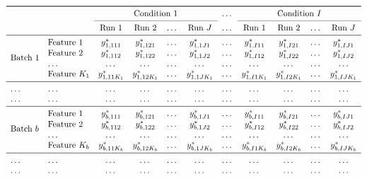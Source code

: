 \documentclass{mcp}
\begin{document}
\begin{figure}[h!]
\centering
\begin{footnotesize}
\[
\begin{array}{l l c c c c c c c c c} 
\toprule
 &  & \multicolumn{4}{c}{\text{Condition }1} & \dots & \multicolumn{4}{c}{\text{Condition }I} \\ 
\cmidrule{3-6} 
\cmidrule{8-11} 
 &  &  \text{Run }1 & \text{Run }2 & \dots & \text{Run }J & \dots & \text{Run }1 & \text{Run }2 & \dots & \text{Run }J \\
\midrule
\multirow{4}{*}{Batch $1$} & \text{Feature }1 & y_{1,111}^{\ast} & y_{1,121}^{\ast} & \dots & y_{1,1J1}^{\ast} & \dots & y_{1,I11}^{\ast} & y_{1,I21}^{\ast} & \dots & y_{1,IJ1}^{\ast} \\
 & \text{Feature }2 & y_{1,112}^{\ast} & y_{1,122}^{\ast} & \dots & y_{1,1J2}^{\ast} & \dots & y_{1,I12}^{\ast} & y_{1,I22}^{\ast} & \dots & y_{1,IJ2}^{\ast}  \\
 & \dots & \dots & \dots & \dots & \dots & \dots & \dots & \dots & \dots & \dots \\
 & \text{Feature }K_1 & y_{1,11K_1}^{\ast} & y_{1,12K_1}^{\ast} & \dots & y_{1,1JK_1}^{\ast} & \dots & y_{1,I1K_1}^{\ast} & y_{1,I2K_1}^{\ast} & \dots & y_{1,IJK_1}^{\ast} \\
\midrule
\dots & \dots & \dots & \dots & \dots & \dots & \dots & \dots & \dots & \dots & \dots \\
\dots & \dots & \dots & \dots & \dots & \dots & \dots & \dots & \dots & \dots & \dots \\
\midrule
\multirow{4}{*}{Batch $b$} & \text{Feature }1 & y_{b,111}^{\ast} & y_{b,121}^{\ast} & \dots & y_{b,1J1}^{\ast} & \dots & y_{b,I11}^{\ast} & y_{b,I21}^{\ast} & \dots & y_{b,IJ1}^{\ast} \\
 & \text{Feature }2 & y_{b,112}^{\ast} & y_{b,122}^{\ast} & \dots & y_{b,1J2}^{\ast} & \dots & y_{b,I12}^{\ast} & y_{b,I22}^{\ast} & \dots & y_{b,IJ2}^{\ast}  \\
 & \dots & \dots & \dots & \dots & \dots & \dots & \dots & \dots & \dots & \dots \\
 & \text{Feature }K_b & y_{b,11K_b}^{\ast} & y_{b,12K_b}^{\ast} & \dots & y_{b,1JK_b}^{\ast} & \dots & y_{b,I1K_b}^{\ast} & y_{b,I2K_b}^{\ast} & \dots & y_{b,IJK_b}^{\ast} \\
\midrule
\dots & \dots & \dots & \dots & \dots & \dots & \dots & \dots & \dots & \dots & \dots \\
\dots & \dots & \dots & \dots & \dots & \dots & \dots & \dots & \dots & \dots & \dots \\

\end{array}\]
\end{footnotesize}
\end{figure}
\end{document}
